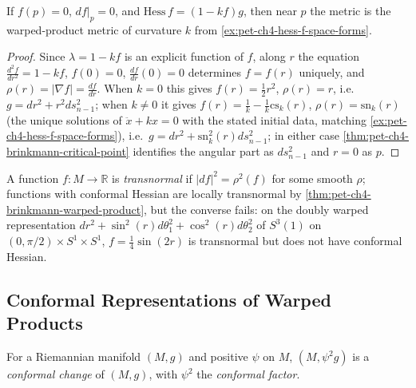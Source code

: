 \begin{corollary}
  \label{cor:pet-ch4-brinkmann-constant-curvature}
  If $f(p)=0$, $df|_p=0$, and $\mathrm{Hess}\,f=(1-kf)g$, then near $p$ the metric
  is the warped-product metric of curvature $k$ from
  \cref{ex:pet-ch4-hess-f-space-forms}.
\end{corollary}
\begin{proof}
  Since $\lambda=1-kf$ is an explicit function of $f$, along $r$ the equation
  $\tfrac{d^2f}{dr^2}=1-kf$, $f(0)=0$, $\tfrac{df}{dr}(0)=0$ determines $f=f(r)$
  uniquely, and $\rho(r)=|\nabla f|=\tfrac{df}{dr}$. When $k=0$ this gives
  $f(r)=\tfrac12r^2$, $\rho(r)=r$, i.e.\ $g=dr^2+r^2ds_{n-1}^2$; when $k\ne0$ it
  gives $f(r)=\tfrac1k-\tfrac1k\mathrm{cs}_k(r)$, $\rho(r)=\mathrm{sn}_k(r)$
  (the unique solutions of $\ddot x+kx=0$ with the stated initial data, matching
  \cref{ex:pet-ch4-hess-f-space-forms}), i.e.\
  $g=dr^2+\mathrm{sn}_k^2(r)ds_{n-1}^2$; in either case
  \cref{thm:pet-ch4-brinkmann-critical-point} identifies the angular part as
  $ds_{n-1}^2$ and $r=0$ as $p$.
\end{proof}

\begin{remark}
  \label{rem:pet-ch4-transnormal-functions}
  A function $f:M\to\mathbb{R}$ is \emph{transnormal} if $|df|^2=\rho^2(f)$ for some
  smooth $\rho$; functions with conformal Hessian are locally transnormal by
  \cref{thm:pet-ch4-brinkmann-warped-product}, but the converse fails: on the
  doubly warped representation $dr^2+\sin^2(r)d\theta_1^2+\cos^2(r)d\theta_2^2$
  of $S^3(1)$ on $(0,\pi/2)\times S^1\times S^1$, $f=\tfrac14\sin(2r)$ is
  transnormal but does not have conformal Hessian.
\end{remark}

\subsection{Conformal Representations of Warped Products}

\begin{definition}
  \label{def:pet-ch4-conformal-change}
  \leanok
  For a Riemannian manifold $(M,g)$ and positive $\psi$ on $M$, $(M,\psi^2g)$ is
  a \emph{conformal change} of $(M,g)$, with $\psi^2$ the \emph{conformal
  factor}.
\end{definition}

